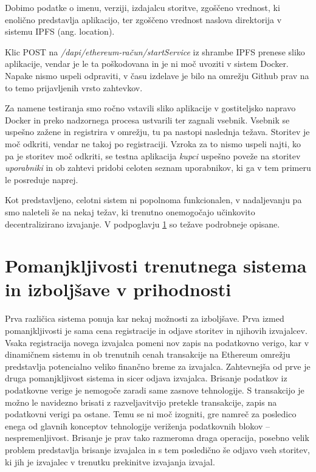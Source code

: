 \documentclass[a4paper, 12pt]{book}
\begin{document}
Dobimo podatke o imenu, verziji, izdajalcu storitve, zgoščeno vrednost, ki enolično predstavlja aplikacijo, ter zgoščeno vrednost naslova direktorija v sistemu IPFS (ang. location).

Klic POST na \textit{/dapi/{ethereum-račun}/startService} iz shrambe IPFS prenese sliko aplikacije, vendar je le ta poškodovana in je ni moč uvoziti v sistem Docker.
Napake nismo uspeli odpraviti, v času izdelave je bilo na omrežju Github prav na to temo prijavljenih vrsto zahtevkov.

Za namene testiranja smo ročno vstavili sliko aplikacije v gostiteljsko napravo Docker in preko nadzornega procesa ustvarili ter zagnali vsebnik.
Vsebnik se uspešno zažene in registrira v omrežju, tu pa nastopi naslednja težava.
Storitev je moč odkriti, vendar ne takoj po registraciji.
Vzroka za to nismo uspeli najti, ko pa je storitev moč odkriti, se testna aplikacija \textit{kupci} uspešno poveže na storitev \textit{uporabniki} in ob zahtevi pridobi celoten seznam uporabnikov, ki ga v tem primeru le posreduje naprej.

Kot predstavljeno, celotni sistem ni popolnoma funkcionalen, v nadaljevanju pa smo naleteli še na nekaj težav, ki trenutno onemogočajo učinkovito decentralizirano izvajanje.
V podpoglavju \ref{improvments} so težave podrobneje opisane.


\section{Pomanjkljivosti trenutnega sistema in izboljšave v prihodnosti}
\label{improvments}

Prva različica sistema ponuja kar nekaj možnosti za izboljšave.
Prva izmed pomanjkljivosti je sama cena registracije in odjave storitev in njihovih izvajalcev.
Vsaka registracija novega izvajalca pomeni nov zapis na podatkovno verigo, kar v dinamičnem sistemu in ob trenutnih cenah transakcije na Ethereum omrežju predstavlja potencialno veliko finančno breme za izvajalca.
Zahtevnejša od prve je druga pomanjkljivost sistema in sicer odjava izvajalca.
Brisanje podatkov iz podatkovne verige je nemogoče zaradi same zasnove tehnologije.
S transakcijo je možno le navidezno brisati z razveljavitvijo pretekle transakcije, zapis na podatkovni verigi pa ostane.
Temu se ni moč izogniti, gre namreč za posledico enega od glavnih konceptov tehnologije veriženja podatkovnih blokov -- nespremenljivost.
Brisanje je prav tako razmeroma draga operacija, posebno velik problem predstavlja brisanje izvajalca in s tem posledično še odjavo vseh storitev, ki jih je izvajalec v trenutku prekinitve izvajanja izvajal.
\end{document}
